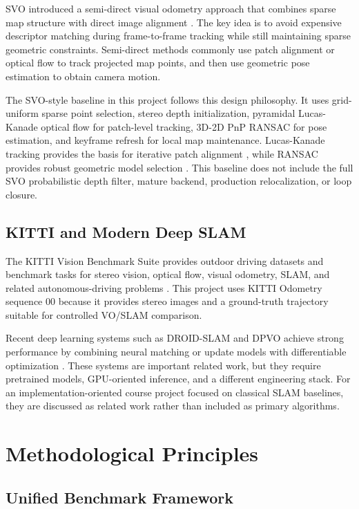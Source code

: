 \documentclass[11pt,a4paper]{article}
\begin{document}
SVO introduced a semi-direct visual odometry approach that combines sparse map structure with direct image alignment \cite{forster2014svo}. The key idea is to avoid expensive descriptor matching during frame-to-frame tracking while still maintaining sparse geometric constraints. Semi-direct methods commonly use patch alignment or optical flow to track projected map points, and then use geometric pose estimation to obtain camera motion.

The SVO-style baseline in this project follows this design philosophy. It uses grid-uniform sparse point selection, stereo depth initialization, pyramidal Lucas-Kanade optical flow for patch-level tracking, 3D-2D PnP RANSAC for pose estimation, and keyframe refresh for local map maintenance. Lucas-Kanade tracking provides the basis for iterative patch alignment \cite{lucas1981iterative}, while RANSAC provides robust geometric model selection \cite{fischler1981random}. This baseline does not include the full SVO probabilistic depth filter, mature backend, production relocalization, or loop closure.

\subsection{KITTI and Modern Deep SLAM}

The KITTI Vision Benchmark Suite provides outdoor driving datasets and benchmark tasks for stereo vision, optical flow, visual odometry, SLAM, and related autonomous-driving problems \cite{geiger2012kitti}. This project uses KITTI Odometry sequence 00 because it provides stereo images and a ground-truth trajectory suitable for controlled VO/SLAM comparison.

Recent deep learning systems such as DROID-SLAM and DPVO achieve strong performance by combining neural matching or update models with differentiable optimization \cite{teed2021droidslam,teed2023dpvo}. These systems are important related work, but they require pretrained models, GPU-oriented inference, and a different engineering stack. For an implementation-oriented course project focused on classical SLAM baselines, they are discussed as related work rather than included as primary algorithms.

\section{Methodological Principles}

\subsection{Unified Benchmark Framework}
\end{document}
